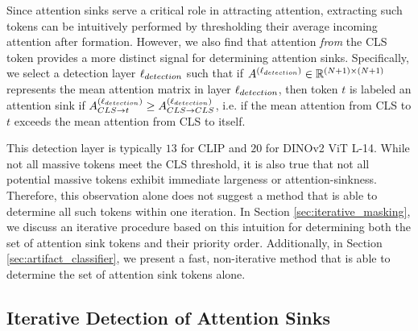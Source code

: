 \documentclass[10pt,twocolumn,letterpaper]{article}
\begin{document}
Since attention sinks serve a critical role in attracting attention, extracting such tokens can be intuitively performed by thresholding their average incoming attention after formation. However, we also find that attention \textit{from} the CLS token provides a more distinct signal for determining attention sinks. Specifically, we select a detection layer $\ell_{detection}$ such that if $A^{(\ell_{detection})} \in \mathbb{R}^{(N + 1) \times (N + 1)}$ represents the mean attention matrix in layer $\ell_{detection}$, then token $t$ is labeled an attention sink if $A^{(\ell_{detection})}_{CLS \to t} \geq A^{(\ell_{detection})}_{CLS \to CLS}$, i.e. if the mean attention from CLS to $t$ exceeds the mean attention from CLS to itself.

This detection layer is typically $13$ for CLIP and $20$ for DINOv2 ViT L-14. While not all massive tokens meet the CLS threshold, it is also true that not all potential massive tokens exhibit immediate largeness or attention-sinkness. Therefore,  this observation alone does not suggest a method that is able to determine all such tokens within one iteration. In Section \ref{sec:iterative_masking}, we discuss an iterative procedure based on this intuition for determining both the set of attention sink tokens and their priority order. Additionally, in Section \ref{sec:artifact_classifier}, we present a fast, non-iterative method that is able to determine the set of attention sink tokens alone.








\subsection{Iterative Detection of Attention Sinks}
\end{document}
